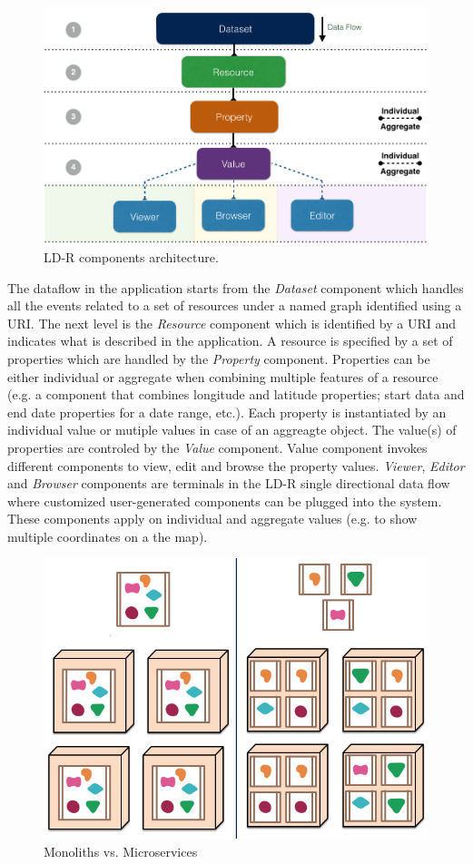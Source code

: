 \documentclass{acm_proc_article-sp}
\begin{document}
\begin{figure}[tb]
  \includegraphics[width=1\linewidth]{images/architecture.jpg}
  \caption{LD-R components architecture.}
  \label{fig:architecture}
\end{figure}

The dataflow in the application starts from the \emph{Dataset} component which handles all the events related to a set of resources under a named graph identified using a URI.
The next level is the \emph{Resource} component which is identified by a URI and indicates what is described in the application.
A resource is specified by a set of properties which are handled by the \emph{Property} component. 
Properties can be either individual or aggregate when combining multiple features of a resource (e.g. a component that combines longitude and latitude properties; start data and end date properties for a date range, etc.).
Each property is instantiated by an individual value or mutiple values in case of an aggreagte object. 
The value(s) of properties are controled by the \emph{Value} component.
Value component invokes different components to view, edit and browse the property values.
\emph{Viewer}, \emph{Editor} and \emph{Browser} components are terminals in the LD-R single directional data flow where customized user-generated components can be plugged into the system.
These components apply on individual and aggregate values (e.g. to show multiple coordinates on a the map).

\begin{figure}[tb]
  \includegraphics[width=.8\linewidth]{images/microservices.jpg}
  \caption{Monoliths vs. Microservices~\cite{microservices}}
  \label{fig:microservices}
\end{figure}
\end{document}
